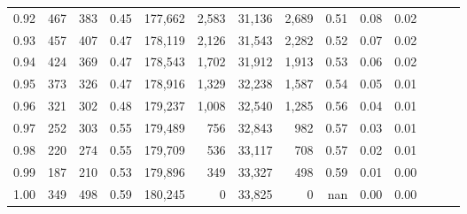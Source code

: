 \begin{tabular}{rrrrrrrrrrrrrr}
0.92 &    467 &  383 &  0.45 &  177,662 &    2,583 &  31,136 &   2,689 &  0.51 &  0.08 &      0.02 \\
0.93 &    457 &  407 &  0.47 &  178,119 &    2,126 &  31,543 &   2,282 &  0.52 &  0.07 &      0.02 \\
0.94 &    424 &  369 &  0.47 &  178,543 &    1,702 &  31,912 &   1,913 &  0.53 &  0.06 &      0.02 \\
0.95 &    373 &  326 &  0.47 &  178,916 &    1,329 &  32,238 &   1,587 &  0.54 &  0.05 &      0.01 \\
0.96 &    321 &  302 &  0.48 &  179,237 &    1,008 &  32,540 &   1,285 &  0.56 &  0.04 &      0.01 \\
0.97 &    252 &  303 &  0.55 &  179,489 &      756 &  32,843 &     982 &  0.57 &  0.03 &      0.01 \\
0.98 &    220 &  274 &  0.55 &  179,709 &      536 &  33,117 &     708 &  0.57 &  0.02 &      0.01 \\
0.99 &    187 &  210 &  0.53 &  179,896 &      349 &  33,327 &     498 &  0.59 &  0.01 &      0.00 \\
1.00 &    349 &  498 &  0.59 &  180,245 &        0 &  33,825 &       0 &   nan &  0.00 &      0.00 \\
\bottomrule
\end{tabular}
